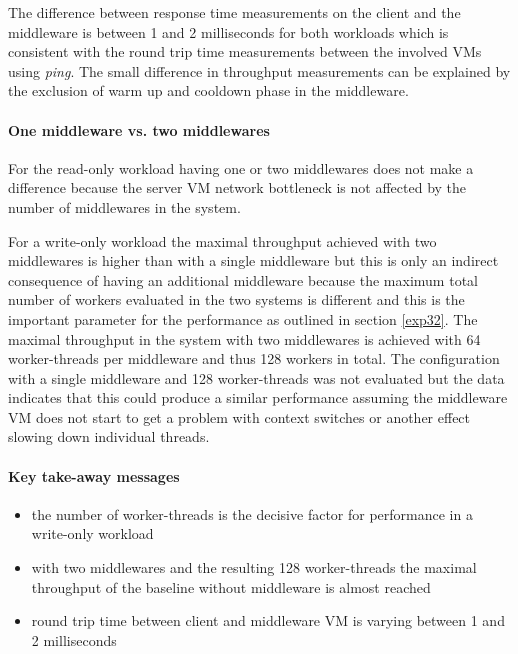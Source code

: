 \documentclass[report.tex]{subfiles}
\begin{document}
The difference between response time measurements on the client and the middleware is between 1 and 2 milliseconds for both workloads which is consistent with the round trip time measurements between the involved VMs using \emph{ping}. The small difference in throughput measurements can be explained by the exclusion of warm up and cooldown phase in the middleware. 

\paragraph{One middleware vs. two middlewares}

For the read-only workload having one or two middlewares does not make a difference because the server VM network bottleneck is not affected by the number of middlewares in the system.

For a write-only workload the maximal throughput achieved with two middlewares is higher than with a single middleware but  this is only an indirect consequence of having an additional middleware because the maximum total number of workers evaluated in the two systems is different and this is the important parameter for the performance as outlined in section \ref{exp32}. The maximal throughput in the system with two middlewares is achieved with 64 worker-threads per middleware and thus 128 workers in total. The configuration with a single middleware and 128 worker-threads was not evaluated but the data indicates that this could produce a similar performance assuming the middleware VM does not start to get a problem with context switches or another effect slowing down individual threads.



\paragraph{Key take-away messages}
\begin{itemize}
	\item the number of worker-threads is the decisive factor for performance in a write-only workload
	\item with two middlewares and the resulting 128 worker-threads the maximal throughput of the baseline without middleware is almost reached
	\item round trip time between client and middleware VM is varying between 1 and 2 milliseconds
\end{itemize}
\end{document}
